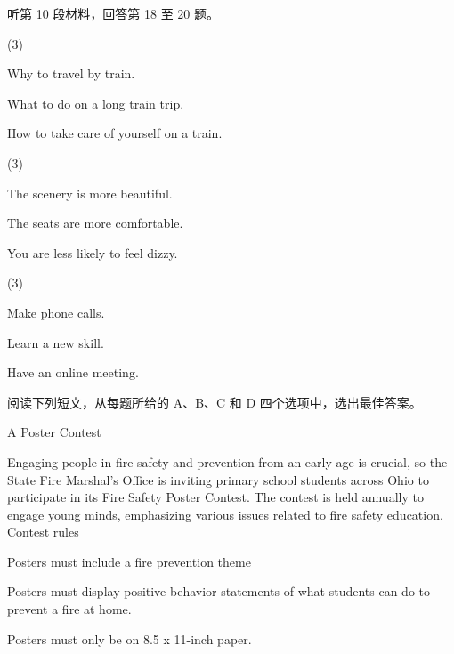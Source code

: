\documentclass{英语试卷}
\begin{document}
\par 听第 10 段材料，回答第 18 至 20 题。\par
{}
\begin{choices}(3)
  \item Why to travel by train.
  \item What to do on a long train trip.
  \item How to take care of yourself on a train.
\end{choices}
\begin{choices}(3)
  \item The scenery is more beautiful.
  \item The seats are more comfortable.
  \item You are less likely to feel dizzy.
\end{choices}
\begin{choices}(3)
  \item Make phone calls.
  \item Learn a new skill.
  \item Have an online meeting.
\end{choices}
\par 阅读下列短文，从每题所给的 A、B、C 和 D 四个选项中，选出最佳答案。\par
{}
\par A Poster Contest\par
\par Engaging people in fire safety and prevention from an early age is crucial, so the State Fire Marshal's Office is inviting primary school students across Ohio to participate in its Fire Safety Poster Contest. The contest is held annually to engage young minds, emphasizing various issues related to fire safety education. Contest rules\par
\par Posters must include a fire prevention theme\par
\par Posters must display positive behavior statements of what students can do to prevent a fire at home.\par
\par Posters must only be on 8.5 x 11-inch paper.\par
\end{document}
